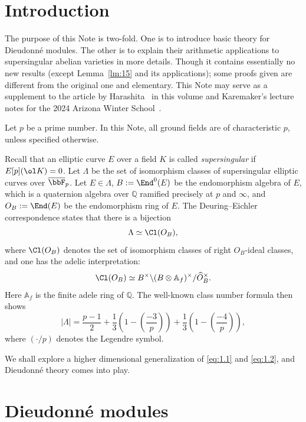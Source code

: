 \documentclass[]{amsart}
\theoremstyle{plain}
\theoremstyle{definition}
\theoremstyle{remark}
\def\Fpbar{\overline{\bbF}_p}
\newcommand{\Q}{\mathbb Q}
\newcommand{\A}{\mathbb A}    %
\newcommand{\<}{\langle}   %
\renewcommand{\>}{\rangle} %
\newcommand{\ac}{algebraically closed }
\newcommand{\dieu}{Dieudonn\'{e} }
\def\wh{\widehat}
\begin{document}
 
\section{Introduction}
The purpose of this Note is two-fold. One is to introduce basic theory for \dieu modules. The other is to explain their arithmetic applications to supersingular abelian varieties in more details. 
Though it contains essentially no new results (except Lemma~\ref{lm:15} and its applications); some proofs given are different from the original one and elementary. 
This Note may serve as a supplement to the article by Harashita~\cite{harashita:2024RIMS} in this volume and Karemaker's lecture notes for the 2024 Arizona Winter School~\cite{karemaker:2024AWS}. 

Let $p$ be a prime number. 
In this Note, all ground fields are of characteristic 
$p$, unless specified otherwise. 

Recall that an elliptic curve $E$ over a field $K$ is called \emph{supersingular} if $E[p](\ol K)=0$. Let $\Lambda$ be the set of isomorphism classes of supersingular elliptic curves over $\Fpbar$. 
Let $E\in \Lambda$, $B:=\End^0(E)$ be the endomorphism algebra of $E$, which is a quaternion algebra over $\Q$ ramified precisely at $p$ and $\infty$, and $O_B:=\End(E)$ be the endomorphism ring of $E$. 
The  Deuring--Eichler correspondence states that there is a bijection 
\begin{equation}
    \label{eq:1.1}
    \Lambda\simeq \Cl (O_B),
\end{equation}
where $\Cl (O_B)$ denotes the set of isomorphism classes of right $O_B$-ideal classes, and one has the adelic interpretation:
\[ \Cl (O_B)\simeq B^\times \backslash (B\otimes \A_f)^\times/ \wh O_B^\times. \]
Here $\A_f$ is the finite adele ring of $\Q$. The well-known class number formula then shows
\begin{equation}
    \label{eq:1.2}
   |\Lambda|=\frac{p-1}{2}+\frac{1}{3} \left(1-\left (\frac{-3}{p} \right ) \right)+\frac{1}{3} \left(1-\left (\frac{-4}{p} \right ) \right), 
\end{equation}
where $(\cdot/p)$ denotes the Legendre symbol. 

We shall explore a higher dimensional generalization of \eqref{eq:1.1} and \eqref{eq:1.2}, and \dieu theory comes into play.  

\section{\dieu modules}
\end{document}
